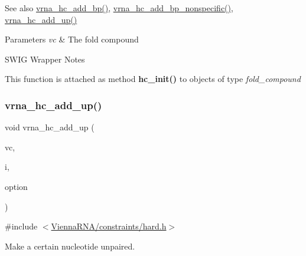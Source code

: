 \begin{DoxySeeAlso}{See also}
\mbox{\hyperlink{group__hard__constraints_ga7cba95ebe2ceb5ec9a5768f2232854fd}{vrna\+\_\+hc\+\_\+add\+\_\+bp()}}, \mbox{\hyperlink{group__hard__constraints_gaed50398ade2d4852c9e82592fe76046c}{vrna\+\_\+hc\+\_\+add\+\_\+bp\+\_\+nonspecific()}}, \mbox{\hyperlink{group__hard__constraints_ga447d88e06ad97bb225cd83310ace8345}{vrna\+\_\+hc\+\_\+add\+\_\+up()}}
\end{DoxySeeAlso}

\begin{DoxyParams}{Parameters}
{\em vc} & The fold compound\\
\hline
\end{DoxyParams}
\begin{DoxyRefDesc}{S\+W\+I\+G Wrapper Notes}
\item[\mbox{\hyperlink{wrappers__wrappers000024}{S\+W\+I\+G Wrapper Notes}}]This function is attached as method {\bfseries{hc\+\_\+init()}} to objects of type {\itshape fold\+\_\+compound} \end{DoxyRefDesc}
\mbox{\label{group__hard__constraints_ga447d88e06ad97bb225cd83310ace8345}} 
\subsubsection{\texorpdfstring{vrna\_hc\_add\_up()}{vrna\_hc\_add\_up()}}
{\footnotesize\ttfamily void vrna\+\_\+hc\+\_\+add\+\_\+up (\begin{DoxyParamCaption}\item[{\mbox{\hyperlink{group__fold__compound_ga1b0cef17fd40466cef5968eaeeff6166}{vrna\+\_\+fold\+\_\+compound\+\_\+t}} $\ast$}]{vc,  }\item[{int}]{i,  }\item[{unsigned char}]{option }\end{DoxyParamCaption})}



{\ttfamily \#include $<$\mbox{\hyperlink{hard_8h}{Vienna\+R\+N\+A/constraints/hard.\+h}}$>$}



Make a certain nucleotide unpaired. 

